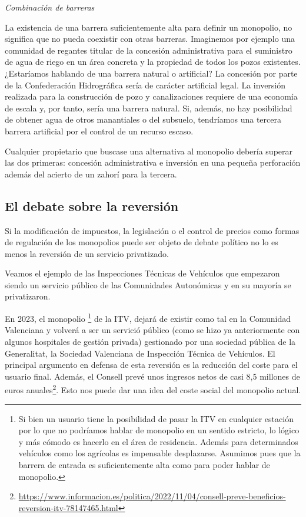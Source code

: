 \documentclass[
]{article}
\begin{document}
\emph{Combinación de barreras}

La existencia de una barrera suficientemente alta para definir un
monopolio, no significa que no pueda coexistir con otras barreras.
Imaginemos por ejemplo una comunidad de regantes titular de la concesión
administrativa para el suministro de agua de riego en un área concreta y
la propiedad de todos los pozos existentes. ¿Estaríamos hablando de una
barrera natural o artificial? La concesión por parte de la Confederación
Hidrográfica sería de carácter artificial legal. La inversión realizada
para la construcción de pozo y canalizaciones requiere de una economía
de escala y, por tanto, sería una barrera natural. Si, además, no hay
posibilidad de obtener agua de otros manantiales o del subsuelo,
tendríamos una tercera barrera artificial por el control de un recurso
escaso.

Cualquier propietario que buscase una alternativa al monopolio debería
superar las dos primeras: concesión administrativa e inversión en una
pequeña perforación además del acierto de un zahorí para la tercera.

\hypertarget{el-debate-sobre-la-reversiuxf3n}{%
\subsection*{El debate sobre la
reversión}\label{el-debate-sobre-la-reversiuxf3n}}

Si la modificación de impuestos, la legislación o el control de precios
como formas de regulación de los monopolios puede ser objeto de debate
político no lo es menos la reversión de un servicio privatizado.

Veamos el ejemplo de las Inspecciones Técnicas de Vehículos que
empezaron siendo un servicio público de las Comunidades Autonómicas y en
su mayoría se privatizaron.

En 2023, el monopolio \footnote{Si bien un usuario tiene la posibilidad
  de pasar la ITV en cualquier estación por lo que no podríamos hablar
  de monopolio en un sentido estricto, lo lógico y más cómodo es hacerlo
  en el área de residencia. Además para determinados vehículos como los
  agrícolas es impensable desplazarse. Asumimos pues que la barrera de
  entrada es suficientemente alta como para poder hablar de monopolio.}
de la ITV, dejará de existir como tal en la Comunidad Valenciana y
volverá a ser un servició público (como se hizo ya anteriormente con
algunos hospitales de gestión privada) gestionado por una sociedad
pública de la Generalitat, la Sociedad Valenciana de Inspección Técnica
de Vehículos. El principal argumento en defensa de esta reversión es la
reducción del coste para el usuario final. Además, el Consell prevé unos
ingresos netos de casi 8,5 millones de euros anuales\footnote{\url{https://www.informacion.es/politica/2022/11/04/consell-preve-beneficios-reversion-itv-78147465.html}}.
Esto nos puede dar una idea del coste social del monopolio actual.
\end{document}
